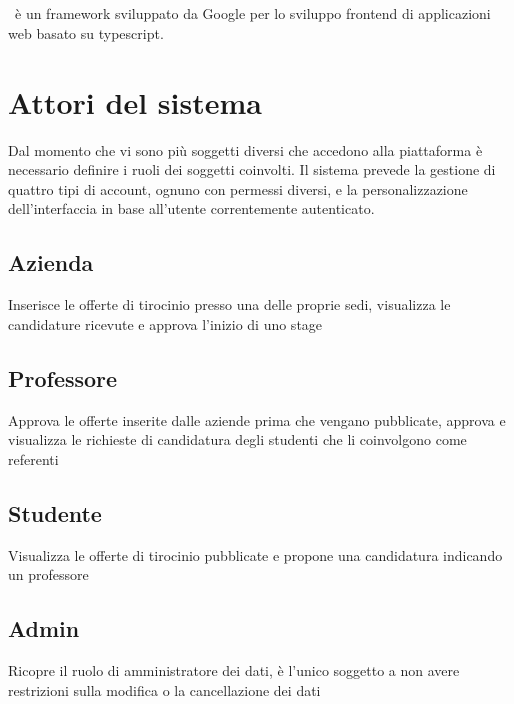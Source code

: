 \subsection{\angular}

\angular~è un \gls{framework} sviluppato da Google per lo sviluppo \gls{frontend} di applicazioni web basato su \gls{typescript}.

\section{Attori del sistema}

Dal momento che vi sono più soggetti diversi che accedono alla piattaforma è necessario definire i ruoli dei soggetti coinvolti. Il sistema prevede la gestione di quattro tipi di account, ognuno con permessi diversi, e la personalizzazione dell'interfaccia in base all'utente correntemente autenticato.

\subsection{Azienda}
Inserisce le offerte di tirocinio presso una delle proprie sedi, visualizza le candidature ricevute e approva l'inizio di uno stage

\subsection{Professore}
Approva le offerte inserite dalle aziende prima che vengano pubblicate, approva e visualizza le richieste di candidatura degli studenti che li coinvolgono come referenti

\subsection{Studente}
Visualizza le offerte di tirocinio pubblicate e propone una candidatura indicando un professore

\subsection{Admin}
Ricopre il ruolo di amministratore dei dati, è l'unico soggetto a non avere restrizioni sulla modifica o la cancellazione dei dati